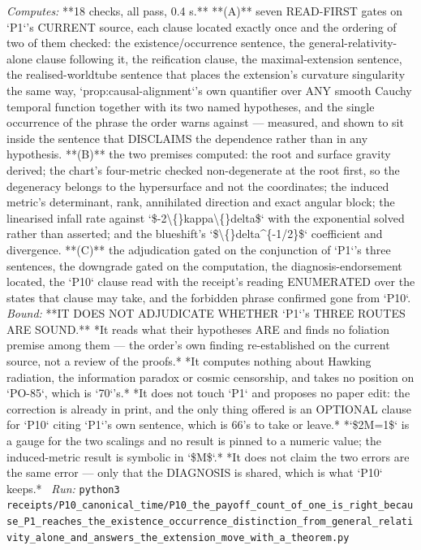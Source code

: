 \begin{description}
\emph{Computes:} **18 checks, all pass, 0.4 s.** **(A)** seven READ-FIRST gates on `P1`'s CURRENT source, each clause located exactly once and the ordering of two of them checked: the existence/occurrence sentence, the general-relativity-alone clause following it, the reification clause, the maximal-extension sentence, the realised-worldtube sentence that places the extension's curvature singularity the same way, `prop:causal-alignment`'s own quantifier over ANY smooth Cauchy temporal function together with its two named hypotheses, and the single occurrence of the phrase the order warns against --- measured, and shown to sit inside the sentence that DISCLAIMS the dependence rather than in any hypothesis. **(B)** the two premises computed: the root and surface gravity derived; the chart's four-metric checked non-degenerate at the root first, so the degeneracy belongs to the hypersurface and not the coordinates; the induced metric's determinant, rank, annihilated direction and exact angular block; the linearised infall rate against `\$-2\textbackslash\{\}kappa\textbackslash\{\}delta\$` with the exponential solved rather than asserted; and the blueshift's `\$\textbackslash\{\}delta\textasciicircum{}\{-1/2\}\$` coefficient and divergence. **(C)** the adjudication gated on the conjunction of `P1`'s three sentences, the downgrade gated on the computation, the diagnosis-endorsement located, the `P10` clause read with the receipt's reading ENUMERATED over the states that clause may take, and the forbidden phrase confirmed gone from `P10`.
 \emph{Bound:}  **IT DOES NOT ADJUDICATE WHETHER `P1`'s THREE ROUTES ARE SOUND.** *It reads what their hypotheses ARE and finds no foliation premise among them --- the order's own finding re-established on the current source, not a review of the proofs.*  *It computes nothing about Hawking radiation, the information paradox or cosmic censorship, and takes no position on `PO-85`, which is `70`'s.*  *It does not touch `P1` and proposes no paper edit: the correction is already in print, and the only thing offered is an OPTIONAL clause for `P10` citing `P1`'s own sentence, which is 66's to take or leave.*  *`\$2M=1\$` is a gauge for the two scalings and no result is pinned to a numeric value; the induced-metric result is symbolic in `\$M\$`.*  *It does not claim the two errors are the same error --- only that the DIAGNOSIS is shared, which is what `P10` keeps.*
\ \emph{Run:} \texttt{python3 receipts/P10\_canonical\_time/P10\_the\_payoff\_count\_of\_one\_is\_right\_because\_P1\_reaches\_the\_existence\_occurrence\_distinction\_from\_general\_relativity\_alone\_and\_answers\_the\_extension\_move\_with\_a\_theorem.py}

\end{description}
